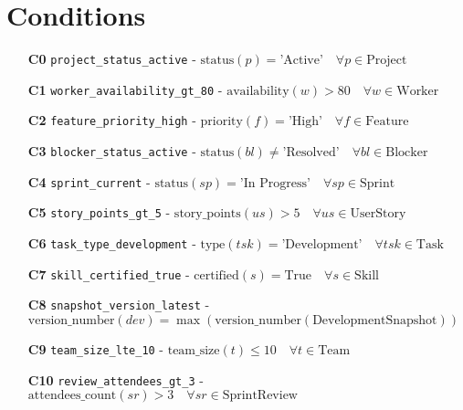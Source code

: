 \documentclass[11pt]{article}
\begin{document}
\section{Conditions}
\begin{itemize}
    \item[\textbf{C0}] \texttt{project\_status\_active} - $\text{status}(p) = \text{'Active'} \quad \forall p \in \text{Project}$
    \item[\textbf{C1}] \texttt{worker\_availability\_gt\_80} - $\text{availability}(w) > 80 \quad \forall w \in \text{Worker}$
    \item[\textbf{C2}] \texttt{feature\_priority\_high} - $\text{priority}(f) = \text{'High'} \quad \forall f \in \text{Feature}$
    \item[\textbf{C3}] \texttt{blocker\_status\_active} - $\text{status}(bl) \neq \text{'Resolved'} \quad \forall bl \in \text{Blocker}$
    \item[\textbf{C4}] \texttt{sprint\_current} - $\text{status}(sp) = \text{'In Progress'} \quad \forall sp \in \text{Sprint}$
    \item[\textbf{C5}] \texttt{story\_points\_gt\_5} - $\text{story\_points}(us) > 5 \quad \forall us \in \text{UserStory}$
    \item[\textbf{C6}] \texttt{task\_type\_development} - $\text{type}(tsk) = \text{'Development'} \quad \forall tsk \in \text{Task}$
    \item[\textbf{C7}] \texttt{skill\_certified\_true} - $\text{certified}(s) = \text{True} \quad \forall s \in \text{Skill}$
    \item[\textbf{C8}] \texttt{snapshot\_version\_latest} - $\text{version\_number}(dev) = \max(\text{version\_number}(\text{DevelopmentSnapshot}))$
    \item[\textbf{C9}] \texttt{team\_size\_lte\_10} - $\text{team\_size}(t) \leq 10 \quad \forall t \in \text{Team}$
    \item[\textbf{C10}] \texttt{review\_attendees\_gt\_3} - $\text{attendees\_count}(sr) > 3 \quad \forall sr \in \text{SprintReview}$
\end{itemize}
\end{document}
